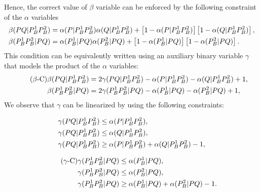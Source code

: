 \documentclass[a4paper,  review, authoryear, 1p.]{elsarticle}
\begin{document}
		\newcommand{\gammaprod}[4]{\gamma(#1#2|#3#4)}
		
		Hence, the correct value of $\beta$ variable can be enforced by the following constraint of the $\alpha$ variables
		\begin{align*}%
			\betamas{P}{Q}{P_B^1}{P_B^2}&=\alphamas{P}{P_B^1}{P_B^2}\alphamas{Q}{P_B^1}{P_B^2} + \left[1-\alphamas{P}{P_B^1}{P_B^2}\right]\left[1-\alphamas{Q}{P_B^1}{P_B^2}\right],\\
			\betamas{P_B^1}{P_B^2}{P}{Q}&=\alphamas{P_B^1}{P}{Q}\alphamas{P_B^2}{P}{Q} + \left[1-\alphamas{P_B^1}{P}{Q}\right]\left[1-\alphamas{P_B^2}{P}{Q}\right].
		\end{align*}
		This condition can be equivalently written using an auxiliary binary variable $\gamma$ that models the product of the $\alpha$ variables:
		\begin{align*}\tag{$\beta$-C}\label{eq:betaC}
			\betamas{P}{Q}{P_B^1}{P_B^2}&=2\gammaprod{P}{Q}{P_B^1}{P_B^2} -\alphamas{P}{P_B^1}{P_B^2}-\alphamas{Q}{P_B^1}{P_B^2}+1,\\
			\betamas{P_B^1}{P_B^2}{P}{Q}&=2\gammaprod{P_B^1}{P_B^2}{P}{Q} -\alphamas{P_B^1}{P}{Q}-\alphamas{P_B^2}{P}{Q}+1,
		\end{align*}
		We observe that $\gamma$ can be linearized by using the following constraints:
		
		\begin{minipage}{.5\linewidth}
			\begin{align*}
				\gammaprod{P}{Q}{P_B^1}{P_B^2} & \leq \alphamas{P}{P_B^1}{P_B^2},\\
				\gammaprod{P}{Q}{P_B^1}{P_B^2} & \leq \alphamas{Q}{P_B^1}{P_B^2},\\
				\gammaprod{P}{Q}{P_B^1}{P_B^2} & \geq \alphamas{P}{P_B^1}{P_B^2} + \alphamas{Q}{P_B^1}{P_B^2} - 1,
			\end{align*}
		\end{minipage}
		\begin{minipage}{.5\linewidth}
			\begin{align*}\tag{$\gamma$-C}\label{eq:gammaC}
				\gammaprod{P_B^1}{P_B^2}{P}{Q} & \leq \alphamas{P_B^1}{P}{Q},\\
				\gammaprod{P_B^1}{P_B^2}{P}{Q} & \leq \alphamas{P_B^2}{P}{Q},\\
				\gammaprod{P_B^1}{P_B^2}{P}{Q} & \geq \alphamas{P_B^1}{P}{Q} + \alphamas{P_B^2}{P}{Q} - 1.
			\end{align*}
		\end{minipage}
		
\end{document}

